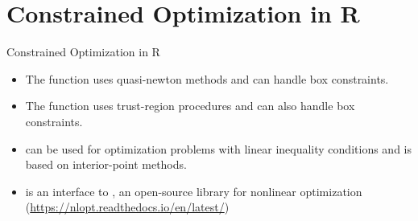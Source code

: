 \documentclass[11pt,compress,t,notes=noshow, xcolor=table]{beamer}
\begin{document}



\section{Constrained Optimization in R}

\begin{vbframe}{Constrained Optimization in R}
\begin{itemize}
\item The function  uses quasi-newton methods and can handle box constraints.
\item The function  uses trust-region procedures and can also handle box constraints.
\item {} can be used for optimization problems with linear inequality conditions and is based on interior-point methods.
\item {} is an interface to , an open-source library for nonlinear optimization (\url{https://nlopt.readthedocs.io/en/latest/})
\end{itemize}

\end{vbframe}











\end{document}
